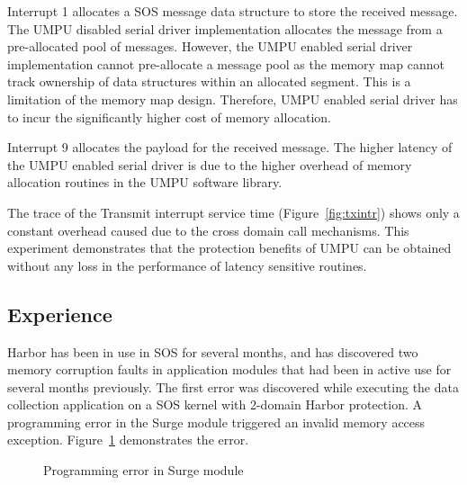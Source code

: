 Interrupt 1 allocates a SOS message data structure to store the
received message.
%
The UMPU disabled serial driver implementation allocates the message
from a pre-allocated pool of messages.
%
However, the UMPU enabled serial driver implementation cannot
pre-allocate a message pool as the memory map cannot track ownership
of data structures within an allocated segment.
%
This is a limitation of the memory map design.
%
Therefore, UMPU enabled serial driver has to incur the significantly
higher cost of memory allocation.
%

Interrupt 9 allocates the payload for the received message.
%
The higher latency of the UMPU enabled serial driver is due to the
higher overhead of memory allocation routines in the UMPU software
library.
%

The trace of the Transmit interrupt service time (Figure~\ref{fig:txintr}) shows only a constant
overhead caused due to the cross domain call mechanisms.
%
This experiment demonstrates that the protection benefits of UMPU can
be obtained without any loss in the performance of latency sensitive
routines.
%
\subsection{Experience} 
%
Harbor has been in use in SOS for several months, and has
%
discovered two memory corruption faults in application modules that had
been in active use for several months previously.
%
The first error was discovered while executing the data collection
application on a SOS kernel with 2-domain Harbor protection.
%
A programming error in the Surge module triggered an invalid memory access exception.
%
Figure~\ref{fig:surge_error} demonstrates the error.

\begin{figure} [h]
  \centering
{}
  \caption{Programming error in Surge module}
  \label{fig:surge_error}
\end{figure}

